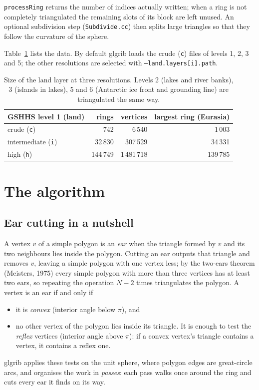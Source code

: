 \documentclass[11pt,a4paper]{article}
\newcommand{\code}[1]{\texttt{#1}}
\begin{document}
\code{processRing} returns the number of indices actually written; when a ring is not completely
triangulated the remaining slots of its block are left unused. An optional subdivision step
(\code{Subdivide.cc}) then splits large triangles so that they follow the curvature of the sphere.

Table~\ref{tab:layers} lists the data. By default glgrib loads the crude (\code{c}) files of levels
1, 2, 3 and 5; the other resolutions are selected with \code{--land.layers[i].path}.

\begin{table}[!htb]
\centering\small
\begin{tabular}{lrrr}
\toprule
GSHHS level 1 (land) & rings & vertices & largest ring (Eurasia) \\
\midrule
crude (\code{c})        &     742 &      6\,540 &   1\,003 \\
intermediate (\code{i}) &  32\,830 &   307\,529 &  34\,331 \\
high (\code{h})         & 144\,749 & 1\,481\,718 & 139\,785 \\
\bottomrule
\end{tabular}
\caption{Size of the land layer at three resolutions. Levels 2 (lakes and river banks), 3
(islands in lakes), 5 and 6 (Antarctic ice front and grounding line) are triangulated the same way.}
\label{tab:layers}
\end{table}

\section{The algorithm}

\subsection{Ear cutting in a nutshell}

A vertex $v$ of a simple polygon is an \emph{ear} when the triangle formed by $v$ and its two
neighbours lies inside the polygon. Cutting an ear outputs that triangle and removes $v$, leaving a
simple polygon with one vertex less; by the two-ears theorem (Meisters, 1975) every simple polygon
with more than three vertices has at least two ears, so repeating the operation $N-2$ times
triangulates the polygon. A vertex is an ear if and only if
\begin{itemize}
\item it is \emph{convex} (interior angle below $\pi$), and
\item no other vertex of the polygon lies inside its triangle. It is enough to test the
  \emph{reflex} vertices (interior angle above $\pi$): if a convex vertex's triangle contains a
  vertex, it contains a reflex one.
\end{itemize}
glgrib applies these tests on the unit sphere, where polygon edges are great-circle arcs, and
organises the work in \emph{passes}: each pass walks once around the ring and cuts every ear it
finds on its way.
\end{document}

